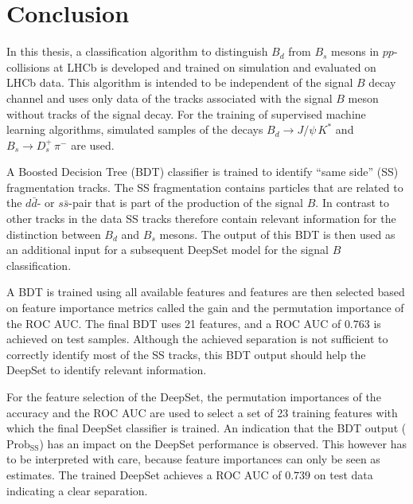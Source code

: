 \chapter{Conclusion}

In this thesis, a classification algorithm to distinguish $B_d$ from $B_s$ mesons in $pp$-collisions at LHCb is developed and trained on simulation and evaluated on LHCb data.
This algorithm is intended to be independent of the signal $B$ decay channel and uses only data of the tracks associated with the signal $B$ meson without tracks of the signal decay.
For the training of supervised machine learning algorithms, simulated samples of the decays $B_d \rightarrow J/\psi \, K^*$ and $B_s \rightarrow D^+_s \, \pi^-$ are used.

A Boosted Decision Tree (BDT) classifier is trained to identify \enquote{same side} (SS) fragmentation tracks.
The SS fragmentation contains particles that are related to the $d\bar{d}$- or $s\bar{s}$-pair that is part of the production of the signal $B$. 
In contrast to other tracks in the data SS tracks therefore contain relevant information for the distinction between $B_d$ and $B_s$ mesons.
The output of this BDT is then used as an additional input for a subsequent DeepSet model for the signal $B$ classification.

A BDT is trained using all available features and features are then selected based on feature importance metrics called the gain and the permutation importance of the ROC AUC. 
The final BDT uses 21 features, and a ROC AUC of $0.763$ is achieved on test samples.
Although the achieved separation is not sufficient to correctly identify most of the SS tracks, this BDT output should help the DeepSet to identify relevant information.

For the feature selection of the DeepSet, the permutation importances of the accuracy and the ROC AUC are used to select a set of 23 training features with which the final DeepSet classifier is trained.
An indication that the BDT output ($\text{Prob}_\text{SS}$) has an impact on the DeepSet performance is observed.
This however has to be interpreted with care, because feature importances can only be seen as estimates.
The trained DeepSet achieves a ROC AUC of $0.739$ on test data indicating a clear separation.

